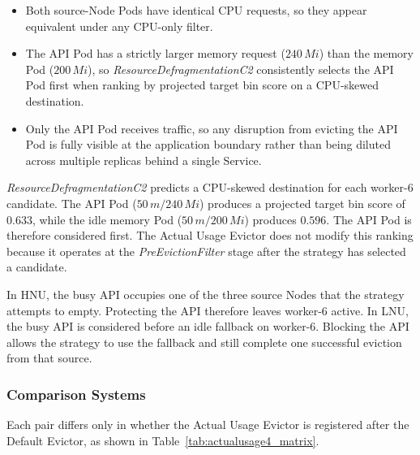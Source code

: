 \begin{itemize}
    \item Both source-Node Pods have identical CPU requests, so they appear equivalent under any CPU-only filter.
    \item The API Pod has a strictly larger memory request (\(240\,Mi\)) than the memory Pod (\(200\,Mi\)), so \textit{ResourceDefragmentationC2} consistently selects the API Pod first when ranking by projected target bin score on a CPU-skewed destination.
    \item Only the API Pod receives traffic, so any disruption from evicting the API Pod is fully visible at the application boundary rather than being diluted across multiple replicas behind a single Service.
\end{itemize}

\textit{ResourceDefragmentationC2} predicts a CPU-skewed destination for each worker-6 candidate. The API Pod (\(50\,m/240\,Mi\)) produces a projected target bin score of \(0.633\), while the idle memory Pod (\(50\,m/200\,Mi\)) produces \(0.596\). The API Pod is therefore considered first. The Actual Usage Evictor does not modify this ranking because it operates at the \textit{PreEvictionFilter} stage after the strategy has selected a candidate.

In HNU, the busy API occupies one of the three source Nodes that the strategy attempts to empty. Protecting the API therefore leaves worker-6 active. In LNU, the busy API is considered before an idle fallback on worker-6. Blocking the API allows the strategy to use the fallback and still complete one successful eviction from that source.

\subsubsection{Comparison Systems}
\label{subsec:actualusage4_scenario}
Each pair differs only in whether the Actual Usage Evictor is registered after the Default Evictor, as shown in Table~\ref{tab:actualusage4_matrix}.

